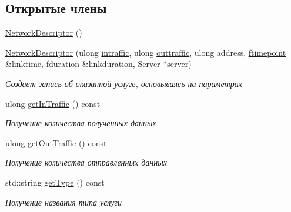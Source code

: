 \subsection*{Открытые члены}
\begin{DoxyCompactItemize}
\item 
\hyperlink{class_network_service_1_1_network_descriptor_a320bf7222afe75a0d132f1e51f22afd9}{Network\+Descriptor} ()
\item 
\hyperlink{class_network_service_1_1_network_descriptor_a06cc19962f4a5da19bb8bd7f3bdd9b8a}{Network\+Descriptor} (ulong \hyperlink{class_network_service_1_1_network_descriptor_ac4fc85cab905739a9513fcfd06ca0453}{intraffic}, ulong \hyperlink{class_network_service_1_1_network_descriptor_a109969d9199b67144184e1b296406edc}{outtraffic}, ulong address, \hyperlink{networkservice_8h_ac877dfabb0f4f6a8184aa821b447e81d}{ftimepoint} \&\hyperlink{class_network_service_1_1_service_descriptor_a08bfd17afce0cba1954d30bd76a14df4}{linktime}, \hyperlink{networkservice_8h_a476cc728ef971cba9111c75ea41a760a}{fduration} \&\hyperlink{class_network_service_1_1_network_descriptor_a30c7b2914f9a815341c0d11653f378db}{linkduration}, \hyperlink{class_network_service_1_1_server}{Server} $\ast$\hyperlink{class_network_service_1_1_service_descriptor_ad504b32ced44a75e0e02ea961d9434c4}{server})
\begin{DoxyCompactList}\small\item\em Создает запись об оказанной услуге, основываясь на параметрах \end{DoxyCompactList}\item 
ulong \hyperlink{class_network_service_1_1_network_descriptor_ad8d2c236158fd870ce202b03d07ce202}{get\+In\+Traffic} () const 
\begin{DoxyCompactList}\small\item\em Получение количества полученных данных \end{DoxyCompactList}\item 
ulong \hyperlink{class_network_service_1_1_network_descriptor_adbc216cb7c97d45161f5ec7c7c5a1aa7}{get\+Out\+Traffic} () const 
\begin{DoxyCompactList}\small\item\em Получение количества отправленных данных \end{DoxyCompactList}\item 
std\+::string \hyperlink{class_network_service_1_1_network_descriptor_abef35df6ca05d7b0ed9e3c0385b9a02a}{get\+Type} () const 
\begin{DoxyCompactList}\small\item\em Получение названия типа услуги \end{DoxyCompactList}\item 

\end{DoxyCompactItemize}
